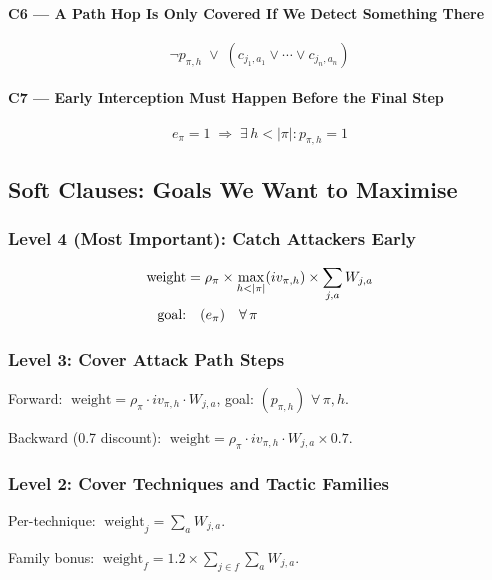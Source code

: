 \documentclass[journal]{IEEEtran}
\begin{document}
\paragraph{C6 --- A Path Hop Is Only Covered If We Detect
Something There}
\begin{equation}
  \neg p_{\pi,h} \;\vee\;(c_{j_1,a_1} \vee \cdots \vee c_{j_n,a_n})
\end{equation}

\paragraph{C7 --- Early Interception Must Happen Before the
Final Step}
\begin{equation}
  e_\pi = 1 \;\Longrightarrow\;
  \exists\, h < |\pi| : p_{\pi,h} = 1
\end{equation}

\subsection{Soft Clauses: Goals We Want to Maximise}

\subsubsection{Level 4 (Most Important): Catch Attackers Early}
\begin{align}
  \text{weight} &= \rho_\pi \times
    \max_{h < |\pi|}(iv_{\pi,h}) \times
    \sum_{j,a} W_{j,a} \notag \\
  \text{goal:} &\quad (e_\pi) \quad \forall\,\pi
\end{align}

\subsubsection{Level 3: Cover Attack Path Steps}
Forward: $\;\text{weight} = \rho_\pi \cdot iv_{\pi,h} \cdot W_{j,a}$,
\;goal: $(p_{\pi,h})$ $\forall\,\pi,h$.

Backward (0.7 discount):
$\;\text{weight} = \rho_\pi \cdot iv_{\pi,h} \cdot W_{j,a} \times 0.7$.

\subsubsection{Level 2: Cover Techniques and Tactic Families}
Per-technique: $\;\text{weight}_j = \sum_a W_{j,a}$.

Family bonus: $\;\text{weight}_f = 1.2 \times
\sum_{j \in f}\sum_a W_{j,a}$.
\end{document}
